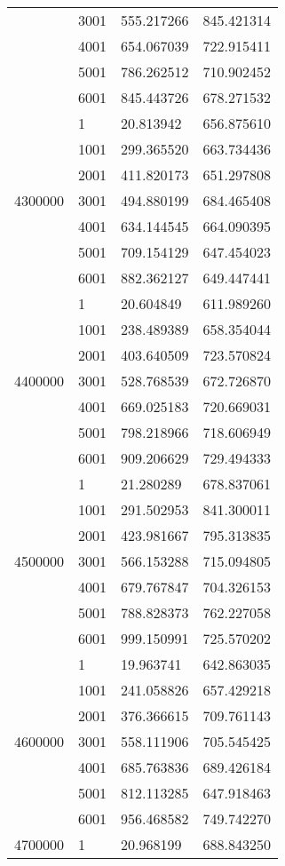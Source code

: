 \begin{table}[htb!]
\begin{tabular}{llll}
 & 3001 & 555.217266 & 845.421314 \\
 & 4001 & 654.067039 & 722.915411 \\
 & 5001 & 786.262512 & 710.902452 \\
 & 6001 & 845.443726 & 678.271532 \\
\multirow[c]{7}{*}{4300000} & 1 & 20.813942 & 656.875610 \\
 & 1001 & 299.365520 & 663.734436 \\
 & 2001 & 411.820173 & 651.297808 \\
 & 3001 & 494.880199 & 684.465408 \\
 & 4001 & 634.144545 & 664.090395 \\
 & 5001 & 709.154129 & 647.454023 \\
 & 6001 & 882.362127 & 649.447441 \\
\multirow[c]{7}{*}{4400000} & 1 & 20.604849 & 611.989260 \\
 & 1001 & 238.489389 & 658.354044 \\
 & 2001 & 403.640509 & 723.570824 \\
 & 3001 & 528.768539 & 672.726870 \\
 & 4001 & 669.025183 & 720.669031 \\
 & 5001 & 798.218966 & 718.606949 \\
 & 6001 & 909.206629 & 729.494333 \\
\multirow[c]{7}{*}{4500000} & 1 & 21.280289 & 678.837061 \\
 & 1001 & 291.502953 & 841.300011 \\
 & 2001 & 423.981667 & 795.313835 \\
 & 3001 & 566.153288 & 715.094805 \\
 & 4001 & 679.767847 & 704.326153 \\
 & 5001 & 788.828373 & 762.227058 \\
 & 6001 & 999.150991 & 725.570202 \\
\multirow[c]{7}{*}{4600000} & 1 & 19.963741 & 642.863035 \\
 & 1001 & 241.058826 & 657.429218 \\
 & 2001 & 376.366615 & 709.761143 \\
 & 3001 & 558.111906 & 705.545425 \\
 & 4001 & 685.763836 & 689.426184 \\
 & 5001 & 812.113285 & 647.918463 \\
 & 6001 & 956.468582 & 749.742270 \\
\multirow[c]{7}{*}{4700000} & 1 & 20.968199 & 688.843250 \\

\end{tabular}
\end{table}
